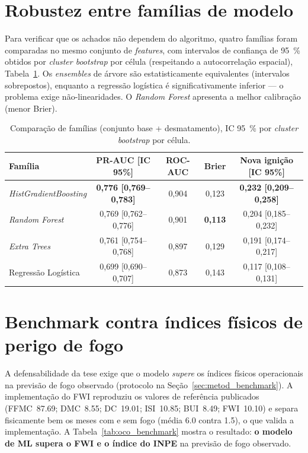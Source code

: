 \section{Robustez entre famílias de modelo}
\label{sec:oco_familias}

Para verificar que os achados não dependem do algoritmo, quatro famílias foram comparadas no
mesmo conjunto de \emph{features}, com intervalos de confiança de \SI{95}{\percent} obtidos
por \emph{cluster bootstrap} por célula (respeitando a autocorrelação espacial),
Tabela~\ref{tab:oco_familias}. Os \emph{ensembles} de árvore são estatisticamente
equivalentes (intervalos sobrepostos), enquanto a regressão logística é significativamente
inferior --- o problema exige não-linearidades. O \emph{Random Forest} apresenta a melhor
calibração (menor Brier).

\begin{table}[h]
\centering
\caption{Comparação de famílias (conjunto base + desmatamento), IC \SI{95}{\percent} por \emph{cluster bootstrap} por célula.}
\label{tab:oco_familias}
\small
\begin{tabular}{lcccc}
\toprule
\textbf{Família} & \textbf{PR-AUC [IC 95\%]} & \textbf{ROC-AUC} & \textbf{Brier} & \textbf{Nova ignição [IC 95\%]} \\
\midrule
\emph{HistGradientBoosting} & \textbf{0,776 [0,769--0,783]} & 0,904 & 0,123 & \textbf{0,232 [0,209--0,258]} \\
\emph{Random Forest} & 0,769 [0,762--0,776] & 0,901 & \textbf{0,113} & 0,204 [0,185--0,232] \\
\emph{Extra Trees} & 0,761 [0,754--0,768] & 0,897 & 0,129 & 0,191 [0,174--0,217] \\
Regressão Logística & 0,699 [0,690--0,707] & 0,873 & 0,143 & 0,117 [0,108--0,131] \\
\bottomrule
\end{tabular}
\end{table}

\section{Benchmark contra índices físicos de perigo de fogo}
\label{sec:oco_benchmark}

A defensabilidade da tese exige que o modelo \emph{supere} os índices físicos operacionais na previsão de fogo observado (protocolo na Seção~\ref{sec:metod_benchmark}). A implementação do FWI reproduziu os valores de referência publicados (FFMC~\num{87,69}; DMC~\num{8,55}; DC~\num{19,01}; ISI~\num{10,85}; BUI~\num{8,49}; FWI~\num{10,10}) e separa fisicamente bem os meses com e sem fogo (média \num{6,0} contra \num{1,5}), o que valida a implementação. A Tabela~\ref{tab:oco_benchmark} mostra o resultado: \textbf{o modelo de ML supera o FWI e o índice do INPE} na previsão de fogo observado.

